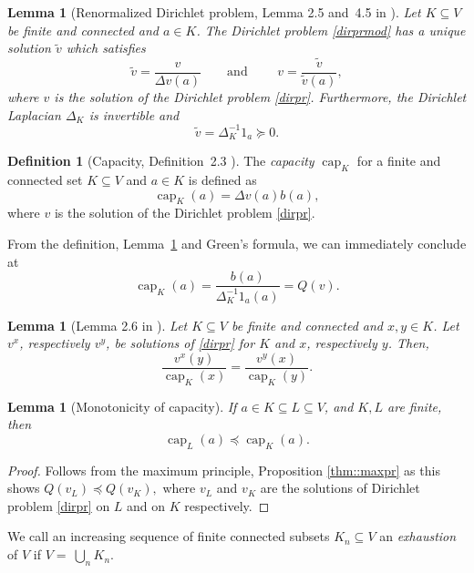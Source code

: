 \documentclass[a4paper,oneside, 12pt]{amsart}
\numberwithin{theorem}{section}
\newtheorem{lemma}[theorem]{Lemma}
\theoremstyle{definition}
\newtheorem{definition}[theorem]{Definition}
\renewcommand{\c}{\operatorname{cap}}
\begin{document}
{\begin{lemma}[Renormalized Dirichlet problem, Lemma 2.5 and~4.5 in \cite{OurPreprint}]\label{lem:RenDP}
Let   $K\subseteq V $ be finite and connected and $ a\in K $. 
	The Dirichlet problem \eqref{dirprmod} has a unique solution $\widetilde v $  which satisfies
	$$ \widetilde v=\dfrac {v}{\Delta v(a)}\qquad\mbox{and }\qquad v=\dfrac{ \widetilde v}{\widetilde v(a)}, $$ where $v$ is the solution of the Dirichlet problem \eqref{dirpr}. Furthermore, the Dirichlet Laplacian $ \Delta_{K} $ is invertible   and 
	$$
	\widetilde v=\Delta^{-1}_{K} 1_a\succeq 0.
	$$
\end{lemma}



\begin{definition}[Capacity, Definition~2.3 \cite{OurPreprint}]\label{def::capK}
The \emph{capacity}  $ \c_{K} $
for a finite and connected set $K\subseteq  V$ and $ a\in K $ is defined as
$$
\c_{K}(a)=\Delta v(a)b(a),
$$
where $v$ is the solution of the Dirichlet problem \eqref{dirpr}.
\end{definition}

From the definition, Lemma~\ref{lem:RenDP} and Green's formula, we can  immediately conclude at
\begin{equation*}
\c_{K}(a)=\dfrac{b(a)}{\Delta^{-1}_{K} 1_a(a)}=Q (v).
\end{equation*}


\begin{lemma}[Lemma 2.6 in \cite{OurPreprint}]\label{lem::FiniteSolxy} Let $ K \subseteq V$ be finite and connected and $ x,y \in K $. Let $ v^{x} $, respectively $ v^{y} $, be solutions of \eqref{dirpr} for $ K $ and $x  $, respectively $ y $. Then,
$$
\dfrac{v^x(y)}{\c_{K}(x)}=\dfrac{v^y(x)}{\c_{K}(y)}.
$$
\end{lemma}

\begin{lemma}[Monotonicity of capacity]\label{lem::monOfcap}
If $a\in K\subseteq L\subseteq V$, and $K, L$ are finite, then
$$
\c_{L}(a)\preceq \c_{K}(a).
$$
\end{lemma}

\begin{proof}
Follows from the maximum principle, Proposition \ref{thm::maxpr} as this shows
$
Q(v_L)\preceq Q(v_K),
$
where $v_L$ and $v_K$ are the solutions of Dirichlet problem \eqref{dirpr} on $L$ and on $K$ respectively.
\end{proof}


We call an increasing sequence of finite connected subsets $ K_{n}\subseteq V $ an \emph{exhaustion} of $V$ if $V=~ \bigcup_{n}K_{n} $.

}
\end{document}
